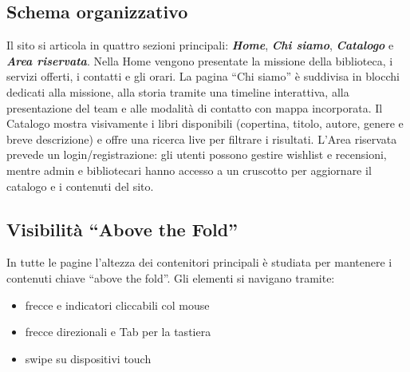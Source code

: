 \documentclass{article}
\begin{document}
\subsection{Schema organizzativo}
Il sito si articola in quattro sezioni principali: \emph{\textbf{Home}}, \emph{\textbf{Chi siamo}}, \emph{\textbf{Catalogo}} e \emph{\textbf{Area riservata}}.  
Nella Home vengono presentate la missione della biblioteca, i servizi offerti, i contatti e gli orari.  
La pagina “Chi siamo” è suddivisa in blocchi dedicati alla missione, alla storia tramite una timeline interattiva, alla presentazione del team e alle modalità di contatto con mappa incorporata.  
Il Catalogo mostra visivamente i libri disponibili (copertina, titolo, autore, genere e breve descrizione) e offre una ricerca live per filtrare i risultati.  
L’Area riservata prevede un login/registrazione: gli utenti possono gestire wishlist e recensioni, mentre admin e bibliotecari hanno accesso a un cruscotto per aggiornare il catalogo e i contenuti del sito.

\subsection{Visibilità “Above the Fold”}
In tutte le pagine l’altezza dei contenitori principali è studiata per mantenere i contenuti chiave “above the fold”. Gli elementi si navigano tramite:
\begin{itemize}
  \item frecce e indicatori cliccabili col mouse  
  \item frecce direzionali e Tab per la tastiera  
  \item swipe su dispositivi touch  
\end{itemize}


\newpage
\end{document}
